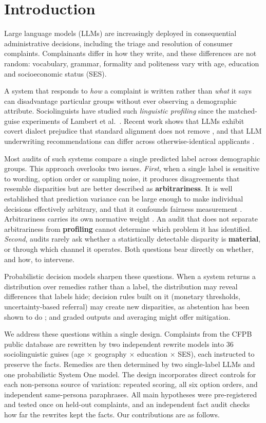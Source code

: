 \section{Introduction}

Large language models (LLMs) are increasingly deployed in consequential administrative decisions, including the triage and resolution of consumer complaints. Complainants differ in how they write, and these differences are not random: vocabulary, grammar, formality and politeness vary with age, education and socioeconomic status (SES).

A system that responds to \emph{how} a complaint is written rather than \emph{what} it says can disadvantage particular groups without ever observing a demographic attribute. Sociolinguists have studied such \emph{linguistic profiling} since the matched-guise experiments of Lambert et al.~\cite{lambert1960}. Recent work shows that LLMs exhibit covert dialect prejudice that standard alignment does not remove \cite{hofmann2024}, and that LLM underwriting recommendations can differ across otherwise-identical applicants \cite{bowen2024}.

Most audits of such systems compare a single predicted label across demographic groups. This approach overlooks two issues. \emph{First}, when a single label is sensitive to wording, option order or sampling noise, it produces disagreements that resemble disparities but are better described as \textbf{arbitrariness}. It is well established that prediction variance can be large enough to make individual decisions effectively arbitrary, and that it confounds fairness measurement \cite{cooper2024,marx2020}. Arbitrariness carries its own normative weight \cite{creel2022}. An audit that does not separate arbitrariness from \textbf{profiling} cannot determine which problem it has identified. \emph{Second}, audits rarely ask whether a statistically detectable disparity is \textbf{material}, or through which channel it operates. Both questions bear directly on whether, and how, to intervene.

Probabilistic decision models sharpen these questions. When a system returns a distribution over remedies rather than a label, the distribution may reveal differences that labels hide; decision rules built on it (monetary thresholds, uncertainty-based referral) may create new disparities, as abstention has been shown to do \cite{jones2021}; and graded outputs and averaging might offer mitigation.

We address these questions within a single design. Complaints from the CFPB public database are rewritten by two independent rewrite models into 36 sociolinguistic guises (age × geography × education × SES), each instructed to preserve the facts. Remedies are then determined by two single-label LLMs and one probabilistic System One model. The design incorporates direct controls for each non-persona source of variation: repeated scoring, all six option orders, and independent same-persona paraphrases. All main hypotheses were pre-registered and tested once on held-out complaints, and an independent fact audit checks how far the rewrites kept the facts. Our contributions are as follows.

